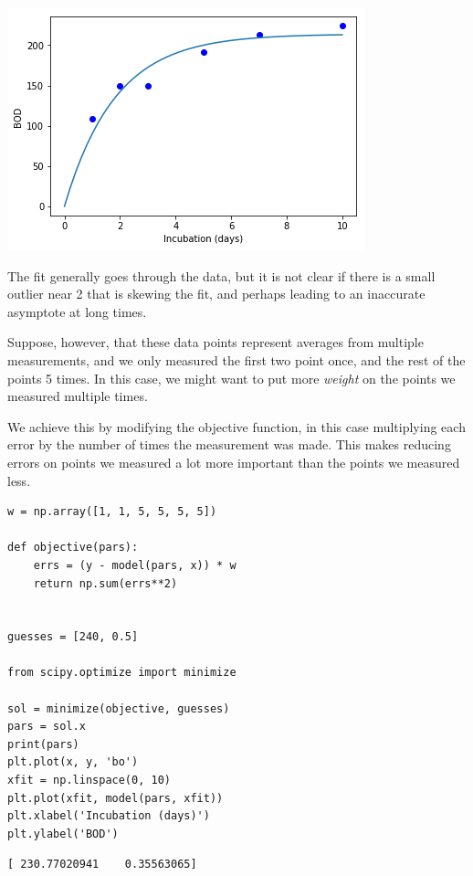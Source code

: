 \documentclass[11pt]{article}
\begin{document}
\begin{center}
\includegraphics[width=.9\linewidth]{obipy-resources/37c51028cef42d76546d882661b04271-20264aXc.png}
\end{center}

The fit generally goes through the data, but it is not clear if there is a small outlier near 2 that is skewing the fit, and perhaps leading to an inaccurate asymptote at long times.

Suppose, however, that these data points represent averages from multiple measurements, and we only measured the first two point once, and the rest of the points 5 times. In this case, we might want to put more \emph{weight} on the points we measured multiple times.

We achieve this by modifying the objective function, in this case multiplying each error by the number of times the measurement was made. This makes reducing errors on points we measured a lot more important than the points we measured less.

\begin{verbatim}
w = np.array([1, 1, 5, 5, 5, 5])

def objective(pars):
    errs = (y - model(pars, x)) * w
    return np.sum(errs**2)


guesses = [240, 0.5]

from scipy.optimize import minimize

sol = minimize(objective, guesses)
pars = sol.x
print(pars)
plt.plot(x, y, 'bo')
xfit = np.linspace(0, 10)
plt.plot(xfit, model(pars, xfit))
plt.xlabel('Incubation (days)')
plt.ylabel('BOD')
\end{verbatim}

\begin{verbatim}
[ 230.77020941    0.35563065]

\end{verbatim}
\end{document}
